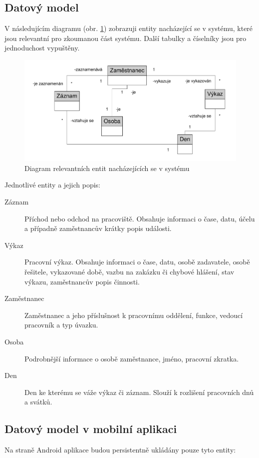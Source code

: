 \documentclass{diplomka}
\begin{document}
\subsection{Datový model}
V následujícím diagramu (obr. \ref{fig:object}) zobrazuji entity nacházející se v systému, které jsou relevantní pro zkoumanou část systému. Další tabulky a číselníky jsou pro jednoduchost vypuštěny.
\begin{figure}[H]
  \centering
  \includegraphics[scale=0.6]{visio/object.pdf}
\caption{Diagram relevantních entit nacházejících se v systému}
\label{fig:object}
\end{figure}
\noindent
Jednotlivé entity a jejich popis:

\begin{description}
\item [Záznam]
Příchod nebo odchod na pracoviště. Obsahuje informaci o čase, datu, účelu a případně zaměstnancův krátky popis události.
\item [Výkaz]
Pracovní výkaz. Obsahuje informaci o čase, datu, osobě zadavatele, osobě řešitele, vykazované době, vazbu na zakázku či chybové hlášení, stav výkazu, zaměstnancův popis činnosti.
\item [Zaměstnanec]
Zaměstnanec a jeho příslušnost k pracovnímu oddělení, funkce, vedoucí pracovník a typ úvazku. 
\item [Osoba]
Podrobnější informace o osobě zaměstnance, jméno, pracovní zkratka.
\item [Den]
Den ke kterému se váže výkaz či záznam. Slouží k rozlišení pracovních dnů a svátků.
\end{description}

\subsection{Datový model v mobilní aplikaci}
Na straně Android aplikace budou persistentně ukládány pouze tyto entity:
\end{document}
